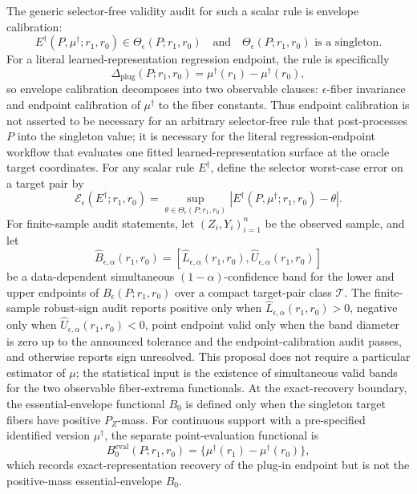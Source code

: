 \documentclass[11pt]{article}
\theoremstyle{definition}
\theoremstyle{plain}
\theoremstyle{remark}
\begin{document}
The generic selector-free validity audit for such a scalar rule is envelope calibration:
\[
E^\dagger(P,\mu^\dagger;r_1,r_0)\in\Theta_\epsilon(P;r_1,r_0)
\quad\text{and}\quad
\Theta_\epsilon(P;r_1,r_0)\text{ is a singleton}.
\]
For a literal learned-representation regression endpoint, the rule is specifically
\[
\Delta_{\mathrm{plug}}(P;r_1,r_0)=\mu^\dagger(r_1)-\mu^\dagger(r_0),
\]
so envelope calibration decomposes into two observable clauses: \(\epsilon\)-fiber invariance and endpoint calibration of \(\mu^\dagger\) to the fiber constants.  Thus endpoint calibration is not asserted to be necessary for an arbitrary selector-free rule that post-processes \(P\) into the singleton value; it is necessary for the literal regression-endpoint workflow that evaluates one fitted learned-representation surface at the oracle target coordinates.  For any scalar rule \(E^\dagger\), define the selector worst-case error on a target pair by
\[
\mathcal E_\epsilon(E^\dagger;r_1,r_0)
=
\sup_{\theta\in\Theta_\epsilon(P;r_1,r_0)}
\left|E^\dagger(P,\mu^\dagger;r_1,r_0)-\theta\right|.
\]
For finite-sample audit statements, let \((Z_i,Y_i)_{i=1}^n\) be the observed sample, and let
\[
\widehat B_{\epsilon,\alpha}(r_1,r_0)
=
[\widehat L_{\epsilon,\alpha}(r_1,r_0),\widehat U_{\epsilon,\alpha}(r_1,r_0)]
\]
be a data-dependent simultaneous \((1-\alpha)\)-confidence band for the lower and upper endpoints of \(B_\epsilon(P;r_1,r_0)\) over a compact target-pair class \(\mathcal T\).  The finite-sample robust-sign audit reports positive only when \(\widehat L_{\epsilon,\alpha}(r_1,r_0)>0\), negative only when \(\widehat U_{\epsilon,\alpha}(r_1,r_0)<0\), point endpoint valid only when the band diameter is zero up to the announced tolerance and the endpoint-calibration audit passes, and otherwise reports sign unresolved.  This proposal does not require a particular estimator of \(\mu\); the statistical input is the existence of simultaneous valid bands for the two observable fiber-extrema functionals.
At the exact-recovery boundary, the essential-envelope functional \(B_0\) is defined only when the singleton target fibers have positive \(P_Z\)-mass.  For continuous support with a pre-specified identified version \(\mu^\dagger\), the separate point-evaluation functional is
\[
B^{\mathrm{eval}}_0(P;r_1,r_0)=\{\mu^\dagger(r_1)-\mu^\dagger(r_0)\},
\]
which records exact-representation recovery of the plug-in endpoint but is not the positive-mass essential-envelope \(B_0\).
\end{document}
